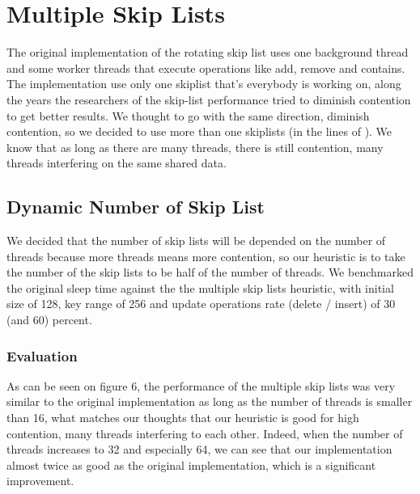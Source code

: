 \documentclass{article}
\begin{document}
\section{Multiple Skip Lists}
\label{sec:msl}

The original implementation of the rotating skip list uses one background thread and some worker threads that execute operations like add, remove and contains.
The implementation use only one skiplist that's everybody is working on, along the years the researchers of the skip-list performance tried to diminish contention to get better results.
We thought to go with the same direction, diminish contention, so we decided to use more than one skiplists (in the lines of \cite{C5}). We know that as long as there are many threads, there is still contention, many threads interfering on the same shared data. 


\subsection{Dynamic Number of Skip List}
\label{ssec:dsrs}

We decided that the number of skip lists will be depended on the number of threads because more threads means more contention, so our heuristic is to take the number of the skip lists to be half of the number of threads.
We benchmarked the original sleep time against the the multiple skip lists heuristic, with initial size of 128, key range of 256 and update operations rate (delete / insert) of 30 (and 60) percent. 

\subsubsection{Evaluation}
\label{sssec:dsrs-evl}

As can be seen on figure 6, the performance of the multiple skip lists was very similar to the original implementation as long as the number of threads is smaller than 16, what matches our thoughts that our heuristic is good for high contention, many threads interfering to each other. Indeed, when the number of threads increases to 32 and especially 64, we can see that our implementation almost twice as good as the original implementation, which is a significant improvement.
\end{document}
